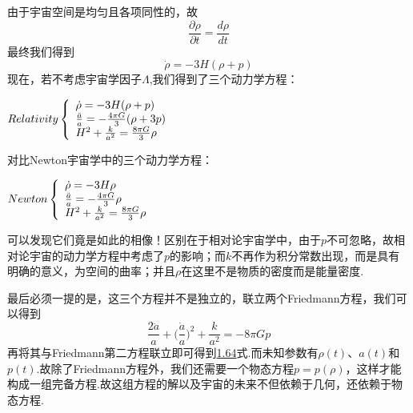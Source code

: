\documentclass[a4paper]{book}
\begin{document}
由于宇宙空间是均匀且各项同性的，故
\begin{equation}
	\frac{\partial \rho}{\partial t}=\frac{d\rho}{dt}
\end{equation}
最终我们得到
\begin{equation}\label{1.64}
	\dot{\rho}=-3H(\rho+p)
\end{equation}
现在，若不考虑宇宙学因子$\varLambda$,我们得到了三个动力学方程：\par 
\centerline{$Relativity\left\{\begin{array}{l l}{\dot{\rho}=-3H(\rho+p)}\\ {\frac{\ddot{a}}{a}=-\frac{4\pi G}{3}(\rho+3p)}\\ {{H^2+\frac{k}{a^2}=\frac{8\pi G}{3}\rho}}\end{array}\right.$}
对比Newton宇宙学中的三个动力学方程：\par 
\centerline{$Newton\left\{\begin{array}{l l}{\dot{\rho}=-3H\rho}\\ {\frac{\ddot{a}}{a}=-\frac{4\pi G}{3}\rho}\\ {{H^2+\frac{k}{a^2}=\frac{8\pi G}{3}\rho}}\end{array}\right.$}
可以发现它们竟是如此的相像！区别在于相对论宇宙学中，由于$p$不可忽略，故相对论宇宙的动力学方程中考虑了$p$的影响；而$k$不再作为积分常数出现，而是具有明确的意义，为空间的曲率；并且$\rho$在这里不是物质的密度而是能量密度.\par 
最后必须一提的是，这三个方程并不是独立的，联立两个Friedmann方程，我们可以得到
\begin{equation}\label{1.65}
	\frac{2\ddot{a}}{a}+\Big(\frac{\dot{a}}{a}\Big)^2+\frac{k}{a^2}=-8\pi Gp
\end{equation}
再将其与Friedmann第二方程联立即可得到\hyperref[1.64]{1.64}式.而未知参数有$\rho(t)$、$a(t)$和$p(t)$.故除了Friedmann方程外，我们还需要一个物态方程$p=p(\rho)$，这样才能构成一组完备方程.故这组方程的解以及宇宙的未来不但依赖于几何，还依赖于物态方程.
\end{document}

